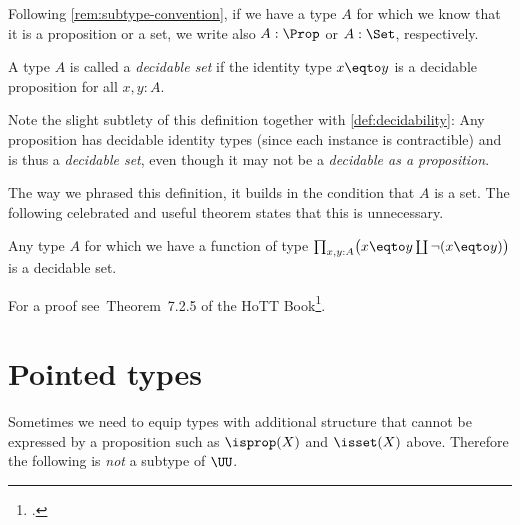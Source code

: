 Following \cref{rem:subtype-convention},
if we have a type $A$ for which we know that it is a proposition or a set,
we write also $A : \Prop$ or $A : \Set$, respectively.

\begin{definition}\label{def:decidable-set}
  A type $A$ is called a \emph{decidable set} if the identity type $x \eqto y$
  is a decidable proposition for all $x,y:A$.
\end{definition}
Note the slight subtlety of this definition together with
\cref{def:decidability}: Any proposition has decidable identity types
(since each instance is contractible) and is thus a \emph{decidable set},
even though it may not be a \emph{decidable as a proposition}.

The way we phrased this definition, it builds in the condition that $A$ is a set.
The following celebrated and useful theorem states that this is unnecessary.
\begin{theorem}[Hedberg]\label{thm:hedberg}
  Any type $A$ for which we have a function of type
  $\prod_{x,y:A}\bigl(x \eqto y \coprod \lnot(x \eqto y)\bigr)$
  is a decidable set.
\end{theorem}
For a proof see~Theorem~7.2.5 of the HoTT Book\footcite{hottbook}.

\section{Pointed types}\label{sec:pointedtypes}
Sometimes we need to equip types with additional structure
that cannot be expressed by a proposition such as
$\isprop(X)$ and $\isset(X)$ above.
Therefore the following is \emph{not} a subtype of $\UU$.

